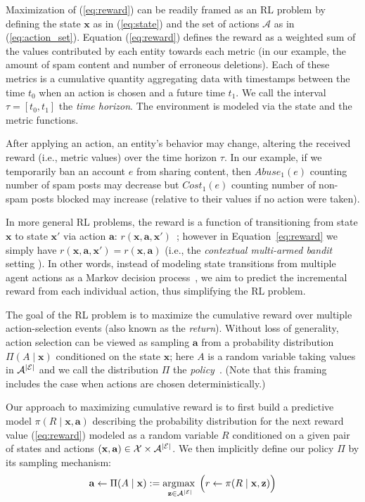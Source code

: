 Maximization of (\ref{eq:reward}) can be readily framed as an RL problem by defining the state $\mathbf{x}$ as in (\ref{eq:state}) and the set of actions $\mathcal{A}$ as in (\ref{eq:action_set}). Equation (\ref{eq:reward}) defines the reward as a weighted sum of the values contributed by each entity towards each metric (in our example, the amount of spam content and number of erroneous deletions). Each of these metrics is a cumulative quantity aggregating data with timestamps between the time $t_0$ when an action is chosen and a future time $t_1$. We call the interval $\tau = [t_0, t_1]$ the {\em time horizon}. The environment is modeled via the state and the metric functions.

After applying an action, an entity's behavior may change, altering the received reward (i.e., metric values) over the time horizon $\tau$. In our example, if we temporarily ban an account $e$ from sharing content, then $Abuse_1(e)$ counting number of spam posts may decrease but $Cost_1(e)$ counting number of non-spam posts blocked may increase (relative to their values if no action were taken). 

In more general RL problems, the reward is a function of transitioning from state $\mathbf{x}$ to state $\mathbf{x}'$ via action $\mathbf{a}$: $r(\mathbf{x},\mathbf{a},\mathbf{x}')$~\cite{sutton2018reinforcement}; however in Equation~\eqref{eq:reward} we simply have $r(\mathbf{x},\mathbf{a},\mathbf{x}') = r(\mathbf{x},\mathbf{a})$ (i.e., the \textit{contextual multi-armed bandit} setting \cite{Li_2010}).  In other words, instead of modeling state transitions from multiple agent actions as a Markov decision process~\cite{puterman2014markov}, we aim to predict the incremental reward from each individual action, thus simplifying the RL problem.

The goal of the RL problem is to maximize the cumulative reward over multiple action-selection events (also known as the \textit{return}). Without loss of generality, action selection can be viewed as sampling $\mathbf{a}$ from a probability distribution $\Pi(A \mid \mathbf{x})$ conditioned on the state $\mathbf{x}$; here $A$ is a random variable taking values in $\mathcal{A}^{\left|\mathcal{E}\right|}$ and we call the distribution $\Pi$ the \emph{policy}~\cite{sutton2018reinforcement}. (Note that this framing includes the case when actions are chosen deterministically.) 

Our approach to maximizing cumulative reward is to first build a predictive model $\pi(R \mid \mathbf{x},\mathbf{a})$ describing the probability distribution for the next reward value (\ref{eq:reward}) modeled as a random variable $R$ conditioned on a given pair of states and actions $(\mathbf{x},\mathbf{a}) \in \mathcal{X} \times \mathcal{A}^{\left|\mathcal{E}\right|}$. We then implicitly define our policy $\Pi$ by its sampling mechanism:
\begin{equation}\label{eq:general_policy}
\mathbf{a} \gets \Pi(A \mid \mathbf{x}) := \operatorname*{\arg\!\max\;}_{\mathbf{z} \in \mathcal{A}^{\left|\mathcal{E}\right|}} \Big( r \gets \pi(R \mid \mathbf{x}, \mathbf{z}) \Big)
\end{equation}

